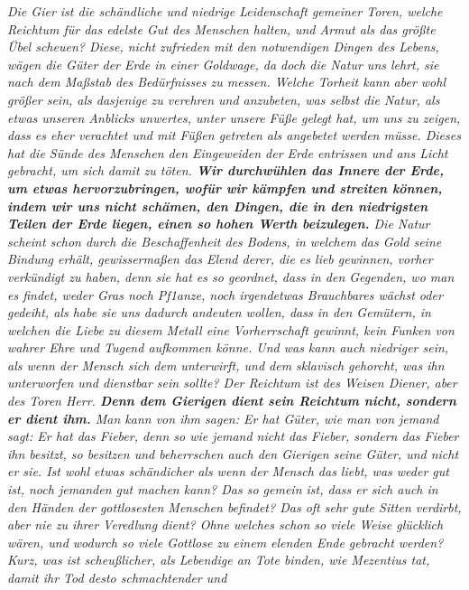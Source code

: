 \textit{Die Gier ist die schändliche und niedrige Leidenschaft gemeiner Toren,
welche
Reichtum für das edelste Gut des Menschen halten, und Armut als das größte
Übel scheuen? Diese, nicht zufrieden mit den notwendigen Dingen des Lebens,
wägen die Güter der Erde in einer Goldwage, da doch die Natur uns lehrt, sie
nach dem Maßstab des Bedürfnisses zu messen. Welche Torheit kann aber wohl
größer sein, als dasjenige zu verehren und anzubeten, was selbst die Natur, als
etwas unseren Anblicks unwertes, unter unsere Füße gelegt hat, um uns zu
zeigen, dass es eher verachtet und mit Füßen getreten als angebetet werden müsse.
Dieses hat die Sünde des Menschen den Eingeweiden der Erde entrissen und ans
Licht gebracht, um sich damit zu töten. \label{ref:13_21_Kapitalisten_kritik}
\textbf{Wir durchwühlen das Innere der
Erde, um
etwas hervorzubringen, wofür wir kämpfen und streiten können, indem wir uns
nicht schämen, den Dingen, die in den niedrigsten Teilen der Erde liegen, einen
so hohen Werth beizulegen.} Die Natur scheint schon durch die Beschaffenheit des
Bodens, in welchem das Gold seine Bindung erhält, gewissermaßen das Elend derer,
die es lieb gewinnen, vorher verkündigt zu haben, denn sie hat es so geordnet,
dass in den Gegenden, wo man es findet, weder Gras noch Pf1anze, noch irgendetwas Brauchbares
wächst oder gedeiht, als habe sie uns dadurch andeuten
wollen, dass in den Gemütern, in welchen die Liebe zu diesem Metall eine
Vorherrschaft gewinnt, kein Funken von wahrer Ehre und Tugend aufkommen könne.
Und was kann auch niedriger sein, als wenn der Mensch sich dem unterwirft, und
dem sklavisch gehorcht, was ihn unterworfen und dienstbar sein sollte? Der
Reichtum ist des Weisen Diener, aber des Toren Herr.
\label{ref:13_21_Kapitalisten_dienerschaft} \textbf{Denn dem Gierigen dient
sein Reichtum nicht, sondern er dient ihm.} Man kann von ihm sagen: Er hat
Güter, wie man von jemand sagt: Er hat das Fieber, denn so wie jemand nicht das
Fieber, sondern das Fieber ihn besitzt, so besitzen und beherrschen auch den
Gierigen seine Güter, und nicht er sie. Ist wohl etwas schändicher als wenn der
Mensch das liebt, was weder gut ist, noch jemanden gut machen kann? Das so
gemein ist, dass er sich auch in den Händen der gottlosesten Menschen befindet?
Das oft sehr gute Sitten verdirbt, aber nie zu ihrer Veredlung dient? Ohne
welches schon so viele Weise glücklich wären, und wodurch so viele Gottlose zu
einem elenden Ende gebracht werden? Kurz, was ist scheußlicher, als Lebendige an
Tote binden, wie Mezentius tat, damit ihr Tod desto
schmachtender und
}
